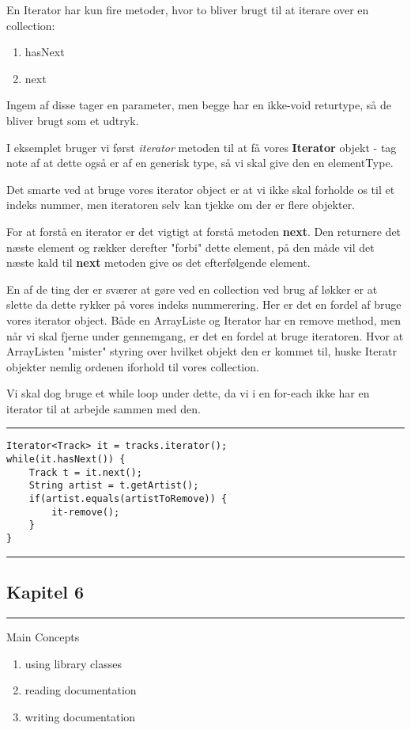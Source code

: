 \documentclass{article}
\begin{document}
\noindent En Iterator har kun fire metoder, hvor to bliver brugt til at iterare over en collection:
\begin{enumerate}
    \item hasNext
    \item next
\end{enumerate}
Ingem af disse tager en parameter, men begge har en ikke-void returtype, så de bliver brugt som et udtryk.

I eksemplet bruger vi først \textit{iterator} metoden til at få vores \textbf{Iterator} objekt - tag note af at dette også er af en generisk type, så vi skal give den en elementType.

Det smarte ved at bruge vores iterator object er at vi ikke skal forholde os til et indeks nummer, men iteratoren selv kan tjekke om der er flere objekter.

For at forstå en iterator er det vigtigt at forstå metoden \textbf{next}. Den returnere det næste element og rækker derefter "forbi" dette element, på den måde vil det næste kald til \textbf{next} metoden give os det efterfølgende element.

En af de ting der er sværer at gøre ved en collection ved brug af løkker er at slette da dette rykker på vores indeks nummerering. Her er det en fordel af bruge vores iterator object. Både en ArrayListe og Iterator har en remove method, men når vi skal fjerne under gennemgang, er det en fordel at bruge iteratoren. Hvor at ArrayListen "mister" styring over hvilket objekt den er kommet til, huske Iteratr objekter nemlig ordenen iforhold til vores collection.

Vi skal dog bruge et while loop under dette, da vi i en for-each ikke har en iterator til at arbejde sammen med den.
\vspace{0.3em}\hrule
\begin{verbatim}
Iterator<Track> it = tracks.iterator();
while(it.hasNext()) {
    Track t = it.next();
    String artist = t.getArtist();
    if(artist.equals(artistToRemove)) {
        it-remove();
    }
}
\end{verbatim}
\hrule\vspace{0.3em}

\newpage
\subsection*{Kapitel 6}
\hrule
\vspace{0.5em}
Main Concepts
\begin{enumerate}
    \item using library classes
    \item reading documentation
    \item writing documentation
\end{enumerate}
\end{document}

